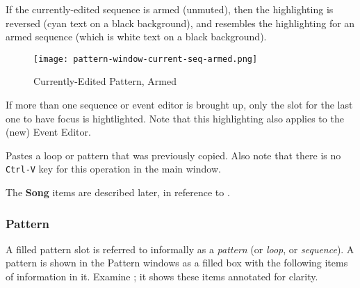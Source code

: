    If the currently-edited sequence is armed (unmuted), then the highlighting
   is reversed (cyan text on a black background), and resembles the
   highlighting for an armed sequence (which is white text on a black
   background).

\begin{figure}[H]
   \centering 
   \texttt{[image: pattern-window-current-seq-armed.png]}
   \caption{Currently-Edited Pattern, Armed}
   \label{fig:pattern_window_current_seq_armed}
\end{figure}

   If more than one sequence or event editor is brought up, only the slot for
   the last one to have focus is hightlighted.
   Note that this highlighting also applies to the (new) Event Editor.

   Pastes a loop or pattern that was previously copied.
   Also note that there is no \texttt{Ctrl-V} key for this operation in the
   main window.

   The \textbf{Song} items are described later, in reference to
   .
   
\subsubsection{Pattern}
\label{subsubsec:seq64_patterns_pattern_filled}

   A filled pattern slot is referred to informally as a \textsl{pattern}
   (or \textsl{loop}, or \textsl{sequence}).
   A pattern is shown in the Pattern windows as a filled box with the
   following items of information in it.
   Examine ; it shows
   these items annotated for clarity.

